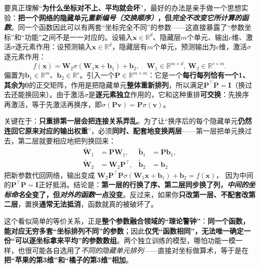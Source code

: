 要真正理解“\textbf{为什么坐标对不上、平均就会坏}”，最好的办法是亲手做一个思想实验：\textbf{把一个网络的隐藏单元\emph{重新编号（交换顺序）}，但\emph{完全不改变它所计算的函数}}。同一个函数因此可以有两套“坐标完全不同”的参数——这直接暴露了“参数坐标”和“功能”之间不是一一对应的。设输入$\bm{x}\in\mathbb{R}^d$、隐藏层$m$个单元、输出$c$维、激活$\sigma$逐元素作用：设预测输入$\bm{x}\in\mathbb{R}^d$，隐藏层有$m$个单元，预测输出为$c$维，激活$\sigma$逐元素作用：
\[
  f(\bm{x})=\bm{W}_2\sigma(\bm{W}_1\bm{x}+\bm{b}_1)+\bm{b}_2,
  \quad \bm{W}_1\in\mathbb{R}^{m\times d},\
  \bm{W}_2\in\mathbb{R}^{c\times m}.
\]
偏置为$\bm{b}_1\in\mathbb{R}^m$、$\bm{b}_2\in\mathbb{R}^c$。引入一个$\bm{P}\in\mathbb{R}^{m\times m}$：它是一个\textbf{每行每列恰有一个1、其余为0}的正交矩阵，作用是把隐藏单元\textbf{整体重新排列}，所以满足$\bm{P}^{\top}\bm{P}=\bm{I}$（换过去还能换回来）。由于激活$\sigma$是\textbf{逐元素独立}作用的，它和这种重排\textbf{可交换}：先换序再激活，等于先激活再换序，即$\sigma(\bm{P}\bm{v})=\bm{P}\sigma(\bm{v})$。

关键在于：\textbf{只重排第一层会把连接关系弄乱}。为了让“换序后的每个隐藏单元\textbf{仍然连回它原来对应的输出权重}”，必须\textbf{同时、配套地变换两层}——第一层把单元换过去，第二层就要相应地把列换回来：
\begin{equation}
  \begin{aligned}
    \widetilde{\bm{W}}_1&=\bm{P}\bm{W}_1,&
    \widetilde{\bm{b}}_1&=\bm{P}\bm{b}_1,\\
    \widetilde{\bm{W}}_2&=\bm{W}_2\bm{P}^{\top},&
    \widetilde{\bm{b}}_2&=\bm{b}_2
  \end{aligned}
  \label{eq:ket-integration-permutation}
\end{equation}
把新参数代回网络，输出变成
$\bm{W}_2\bm{P}^{\top}\bm{P}\sigma(\bm{W}_1\bm{x}+\bm{b}_1)+\bm{b}_2=f(\bm{x})$，
因为中间的$\bm{P}^{\top}\bm{P}=\bm{I}$正好抵消。结论是：\textbf{第一层的行换了序、第二层同步换了列，\emph{中间的坐标命名}全变了，但\emph{对外的函数}一点没变}。反过来，如果你\textbf{只改第一层、不配套改第二层}，置换\textbf{通常无法抵消}，函数就真的被破坏了。

这个看似简单的等价关系，正是\textbf{整个参数融合领域的“理论警钟”}：\textbf{同一个函数，能对应无穷多套“坐标排列不同”的参数}；因此\textbf{仅凭“函数相同”，无法唯一确定一份“可以逐坐标拿来平均”的参数数组}。两个独立训练的模型，哪怕功能一模一样，也很可能各自选用了\emph{不同的隐藏单元排列}——直接对坐标做算术，等于是在\textbf{把“苹果的第3维”和“橘子的第3维”相加}。

